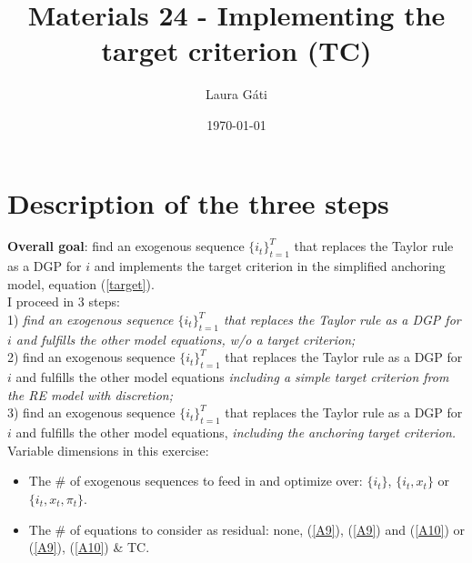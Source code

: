 \documentclass[11pt]{article}
\renewcommand{\[}{\begin{equation}}
\renewcommand{\]}{\end{equation}}
\begin{document}
\linespread{1.0}

\title{Materials 24 - Implementing the target criterion (TC)}
\author{Laura G\'ati} 
\date{\today}
\maketitle


\tableofcontents


\newpage
\section{Description of the three steps}
\textbf{Overall goal}: find an exogenous sequence $\{i_t\}_{t=1}^{T}$ that replaces the Taylor rule as a DGP for $i$ and implements the target criterion in the simplified anchoring model, equation (\ref{target}).\\
I proceed in 3 steps: \\
1) \emph{find an exogenous sequence $\{i_t\}_{t=1}^{T}$ that replaces the Taylor rule as a DGP for $i$ and fulfills the other model equations, w/o a target criterion;} \\
2) find an exogenous sequence $\{i_t\}_{t=1}^{T}$ that replaces the Taylor rule as a DGP for $i$ and fulfills the other model equations \emph{including a simple target criterion from the RE model with discretion;} \\
3) find an exogenous sequence $\{i_t\}_{t=1}^{T}$ that replaces the Taylor rule as a DGP for $i$ and fulfills the other model equations, \emph{including the anchoring target criterion.} \\
Variable dimensions in this exercise:
\begin{itemize}
\item The \# of exogenous sequences to feed in and optimize over: $\{i_t\}$, $\{i_t, x_t\}$ or $\{i_t, x_t, \pi_t\}$.
\item The \# of equations to consider as residual: none, (\ref{A9}), (\ref{A9}) and (\ref{A10}) or (\ref{A9}), (\ref{A10}) \& TC.
\end{itemize}
\end{document}
